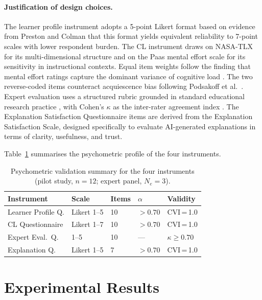 \documentclass[ASNA,twocolumn]{USG} %
\begin{document}
\paragraph{Justification of design choices.}
The learner profile instrument adopts a 5-point Likert format based
on evidence from Preston and Colman \cite{Preston2000} that this
format yields equivalent reliability to 7-point scales with lower
respondent burden. The CL instrument draws on NASA-TLX \cite{Hart1988}
for its multi-dimensional structure and on the Paas mental effort
scale \cite{Paas1992} for its sensitivity in instructional contexts.
Equal item weights follow the finding that mental effort ratings
capture the dominant variance of cognitive load \cite{Paas2003}.
The two reverse-coded items counteract acquiescence bias following
Podsakoff et al.\ \cite{Podsakoff2003}. Expert evaluation uses a
structured rubric grounded in standard educational research practice
\cite{Lynn1986}, with Cohen's $\kappa$ as the inter-rater agreement
index \cite{Landis1977}. The Explanation Satisfaction Questionnaire
items are derived from the Explanation Satisfaction Scale, designed
specifically to evaluate AI-generated explanations in terms of
clarity, usefulness, and trust.

Table~\ref{tab:psychometric_summary} summarises the psychometric
profile of the four instruments.

\begin{table}[ht]
\caption{Psychometric validation summary for the four instruments
(pilot study, $n{=}12$; expert panel, $N_e{=}3$).}
\label{tab:psychometric_summary}
\begin{tabular*}{\hsize}{@{\extracolsep{\fill}}lllll@{}}
\toprule
Instrument & Scale & Items & $\alpha$ & Validity \\
\midrule
Learner Profile Q.   & Likert 1--5 & 10 & $>0.70$ & CVI\,=\,1.0 \\
CL Questionnaire     & Likert 1--7 & 10 & $>0.70$ & CVI\,=\,1.0 \\
Expert Eval.\ Q.     & 1--5       & 10 & ---       & $\kappa \geq 0.70$ \\
Explanation Q.       & Likert 1--5 & 7  & $>0.70$ & CVI\,=\,1.0 \\
\bottomrule
\end{tabular*}
\end{table}

\section{Experimental Results}
\label{sec:realworld_results}
\end{document}
